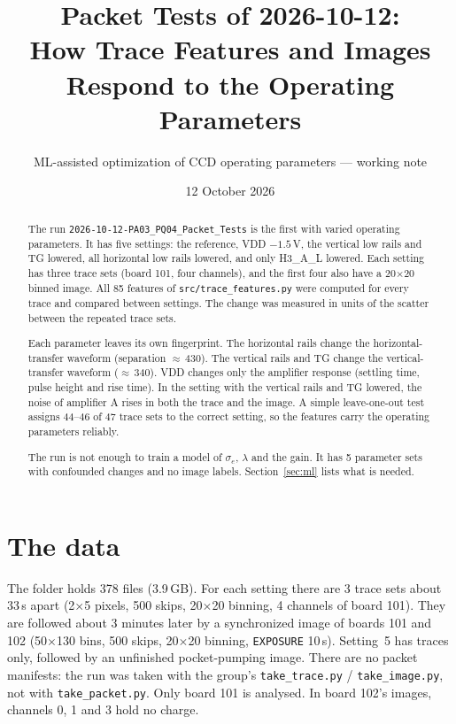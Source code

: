 \documentclass[10pt]{article}
\title{Packet Tests of 2026-10-12:\\ How Trace Features and Images Respond to the Operating Parameters}
\author{ML-assisted optimization of CCD operating parameters --- working note}
\date{12 October 2026}
\newcommand{\code}[1]{\texttt{#1}}
\begin{document}
\maketitle

\begin{abstract}
The run \code{2026-10-12-PA03\_PQ04\_Packet\_Tests} is the first with varied operating parameters. It has five settings:
the reference, VDD $-1.5$\,V, the vertical low rails and TG lowered, all horizontal low rails lowered, and only H3\_A\_L
lowered. Each setting has three trace sets (board 101, four channels), and the first four also have a 20$\times$20 binned image.
All 85 features of \code{src/trace\_features.py} were computed for every trace and compared between settings. The change was
measured in units of the scatter between the repeated trace sets.

Each parameter leaves its own fingerprint. The horizontal rails change the horizontal-transfer waveform (separation
$\approx$\,430). The vertical rails and TG change the vertical-transfer waveform ($\approx$\,340). VDD changes only the
amplifier response (settling time, pulse height and rise time). In the setting with the vertical rails and TG lowered, the
noise of amplifier A rises in both the trace and the image. A simple leave-one-out test assigns 44--46 of 47 trace sets to the
correct setting, so the features carry the operating parameters reliably.

The run is not enough to train a model of $\sigma_e$, $\lambda$ and the gain. It has 5 parameter sets with confounded
changes and no image labels. Section~\ref{sec:ml} lists what is needed.
\end{abstract}

\tableofcontents

\section{The data}

The folder holds 378 files (3.9\,GB). For each setting there are 3 trace sets about 33\,s apart (2$\times$5 pixels, 500 skips,
20$\times$20 binning, 4 channels of board 101). They are followed about 3 minutes later by a synchronized image of boards 101 and
102 (50$\times$130 bins, 500 skips, 20$\times$20 binning, \code{EXPOSURE} 10\,s). Setting~5 has traces only, followed by an unfinished
pocket-pumping image. There are no packet manifests: the run was taken with the group's \code{take\_trace.py} /
\code{take\_image.py}, not with \code{take\_packet.py}. Only board 101 is analysed. In board 102's images, channels 0, 1 and 3
hold no charge.
\end{document}
